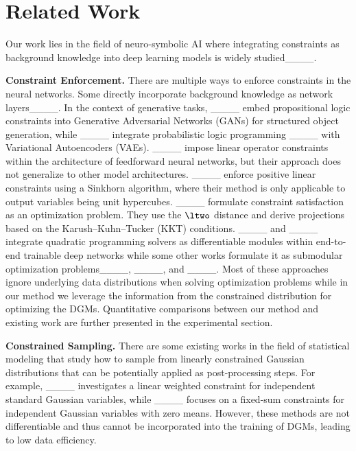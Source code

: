 \section{Related Work}
Our work lies in the field of neuro-symbolic AI where integrating constraints as background knowledge into deep learning models is widely studied____. 

\textbf{Constraint Enforcement.}
There are multiple ways to enforce constraints in the neural networks.
Some directly incorporate background knowledge as network layers____.
In the context of generative tasks, ____ embed propositional logic constraints into Generative Adversarial Networks (GANs) for structured object generation, while ____ integrate probabilistic logic programming ____ with Variational Autoencoders (VAEs). 
____ impose linear operator constraints within the architecture of feedforward neural networks, but their approach does not generalize to other model architectures. 
____ enforce positive linear constraints using a Sinkhorn algorithm, where their method is only applicable to output variables being unit hypercubes. 
____ formulate constraint satisfaction as an optimization problem. They use the $\ltwo$ distance and derive projections based on the Karush–Kuhn–Tucker (KKT) conditions. 
____ and ____ integrate quadratic programming solvers as differentiable modules within end-to-end trainable deep networks
while some other works formulate it as submodular optimization problems____, ____, and ____. 
Most of these approaches ignore underlying data distributions when solving optimization problems
while in our method we leverage the information from the constrained distribution for optimizing the DGMs.
Quantitative comparisons between our method and existing work are further presented in the experimental section.



\textbf{Constrained Sampling.}
There are some existing works in the field of statistical modeling that study how to sample from linearly constrained Gaussian distributions that can be potentially applied as post-processing steps.
For example, ____ investigates a linear weighted constraint for independent standard Gaussian variables, while ____ focuses on a fixed-sum constraints for independent Gaussian variables with zero means.
However, these methods are not differentiable and thus cannot be incorporated into the training of DGMs, 
leading to low data efficiency.


